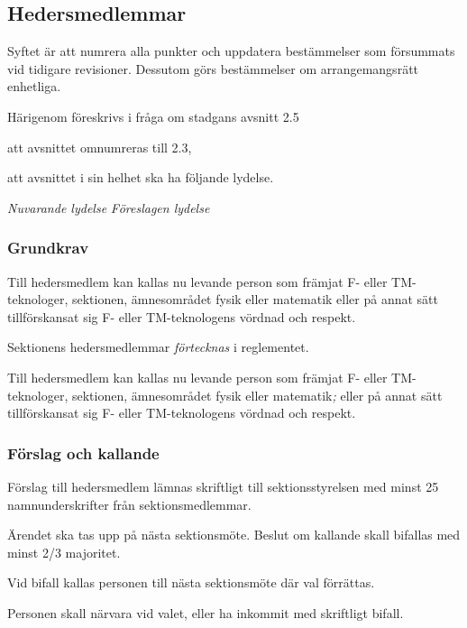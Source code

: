 \documentclass{article}
\newenvironment{lydelse}
    {\begin{paracol}{2}%
        \emph{Nuvarande lydelse}%
        \switchcolumn%
        \emph{Föreslagen lydelse}%
    \end{paracol}%
    \begin{enumerate}[label=\thesubsection.\arabic*]%
    \begin{paracol}{2}%
    }{\end{paracol}\end{enumerate}}
\newcommand{\itemb}{\item[\textbullet]}
\begin{document}
\setcounter{subsection}{2}
\subsection{Hedersmedlemmar}
Syftet är att numrera alla punkter och uppdatera bestämmelser som försummats vid tidigare revisioner.
Dessutom görs bestämmelser om arrangemangsrätt enhetliga.

Härigenom föreskrivs i fråga om stadgans avsnitt 2.5
\begin{dels}
    \item att avsnittet omnumreras till 2.3,
    \item att avsnittet i sin helhet ska ha följande lydelse.
\end{dels}

\begin{lydelse}%
    \subsubsection*{Grundkrav}
    \itemb Till hedersmedlem kan kallas nu levande person som främjat F- eller TM-tekno\-loger, sektionen, ämnesområdet fysik eller matematik eller på annat sätt till\-för\-skansat sig F- eller TM-tekno\-logens vördnad och respekt.
    \item[]
    
\switchcolumn
    \setcounter{subsection}{3}
    \item Sektionens hedersmedlemmar \emph{förtecknas} i reglementet.
    
    \item Till hedersmedlem kan kallas nu levande person som främjat F- eller TM-tekno\-loger, sektionen, ämnesområdet fysik eller matematik\emph{;} eller på annat sätt till\-för\-skansat sig F- eller TM-tekno\-logens vördnad och respekt.
    
\switchcolumn*
    \subsubsection*{Förslag och kallande}%
    \itemb Förslag till hedersmedlem lämnas skriftligt till sektionsstyrelsen med minst 25 namnunderskrifter från sektionsmedlemmar.

    \itemb Ärendet ska tas upp på nästa sektionsmöte. Beslut om kallande skall bifallas med minst 2/3 majoritet.
    
    \itemb Vid bifall kallas personen till nästa sektionsmöte där val förrättas.

    \itemb Personen skall närvara vid valet, eller ha inkommit med skriftligt bifall.


\end{lydelse}
\end{document}
